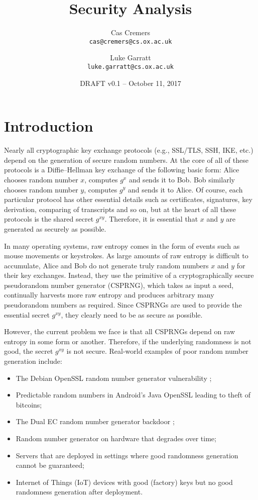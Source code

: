 \documentclass[12pt]{article}
\author{
  Cas Cremers\\
  \texttt{cas@cremers@cs.ox.ac.uk}
  \and
  Luke Garratt\\
  \texttt{luke.garratt@cs.ox.ac.uk}
}
\title{Security Analysis}
\date{DRAFT v0.1 -- October 11, 2017}
\begin{document}
  \maketitle



\section{Introduction}
Nearly all cryptographic key exchange protocols (e.g., SSL/TLS, SSH, IKE, etc.) depend on the generation of secure random numbers. At the core of all of these protocols is a Diffie--Hellman key exchange of the following basic form: Alice chooses random number $x$, computes $g^x$ and sends it to Bob. Bob similarly chooses random number $y$, computes $g^y$ and sends it to Alice. Of course, each particular protocol has other essential details such as certificates, signatures, key derivation, comparing of transcripts and so on, but at the heart of all these protocols is the shared secret $g^{xy}$. Therefore, it is essential that $x$ and $y$ are generated as securely as possible. 

In many operating systems, raw entropy comes in the form of events such as mouse movements or keystrokes. As large amounts of raw entropy is difficult to accumulate, Alice and Bob do not generate truly random numbers $x$ and $y$ for their key exchanges. Instead, they use the primitive of a cryptographically secure pseudorandom number generator (CSPRNG), which takes as input a seed, continually harvests more raw entropy and  produces arbitrary many pseudorandom numbers as required. Since CSPRNGs are used to provide the essential secret $g^{xy}$, they clearly need to be as secure as possible. 

However, the current problem we face is that all CSPRNGs depend on raw entropy in some form or another. Therefore, if the underlying randomness is not good, the secret $g^{xy}$ is not secure. Real-world examples of poor random number generation include:

\begin{itemize}
\item The Debian OpenSSL random number generator vulnerability \cite{DebianRNGflaw, DebianRNGflawTLSDHE};

\item Predictable random numbers in Android's Java OpenSSL \cite{MarvinGoogle2013} leading to theft of bitcoins;

\item The Dual EC random number generator backdoor \cite{DualECstandardisedbackdoor};

\item Random number generator on hardware that degrades over time;

\item Servers that are deployed in settings where good randomness generation cannot be guaranteed;

\item Internet of Things (IoT) devices with good (factory) keys but no good randomness generation after deployment.
\end{itemize}
\end{document}
